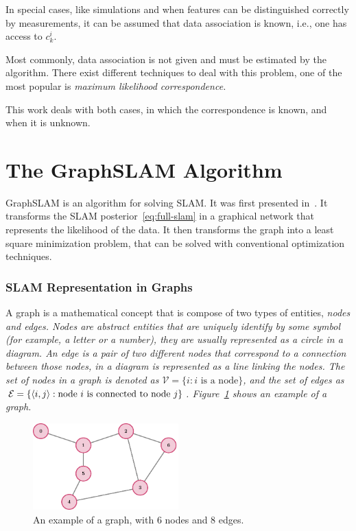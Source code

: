 In special cases, like simulations and when features can be distinguished correctly by measurements, it can be assumed that data association is known, i.e., one has access to $c_k^i$. 

Most commonly, data association is not given and must be estimated by the algorithm. There exist different techniques to deal with this problem, one of the most popular is \it{maximum likelihood correspondence}.

This work deals with both cases, in which the correspondence is known, and when it is unknown.

\section{The GraphSLAM Algorithm}
\label{sec:graphslam-description}

GraphSLAM is an algorithm for solving SLAM. It was first presented in~\cite{graphslam}. It transforms the SLAM posterior~\eqref{eq:full-slam} in a graphical network that represents the likelihood of the data. It then transforms the graph into a least square minimization problem, that can be solved with conventional optimization techniques.

\subsubsection{SLAM Representation in Graphs}

A graph is a mathematical concept that is compose of two types of entities, \it{nodes} and \it{edges}. Nodes are abstract entities that are uniquely identify by some symbol (for example, a letter or a number), they are usually represented as a circle in a diagram. An edge is a pair of two different nodes that correspond to a connection between those nodes, in a diagram is represented as a line linking the nodes. The set of nodes in a graph is denoted as $\mathcal{V} = \{i : i\text{ is a node}\}$, and the set of edges as $\mathcal{E} = \{\left<i,j\right>:\text{node }i\text{ is connected to node }j\}$. Figure~\ref{fig:graph} shows an example of a graph.

\begin{figure}[htbp!]
    \centering
    \includegraphics[width=0.5\textwidth]{tikz/graph.pdf}
    \caption[An example of a graph]{An example of a graph, with 6 nodes and 8 edges.}
    \label{fig:graph}
\end{figure}  

